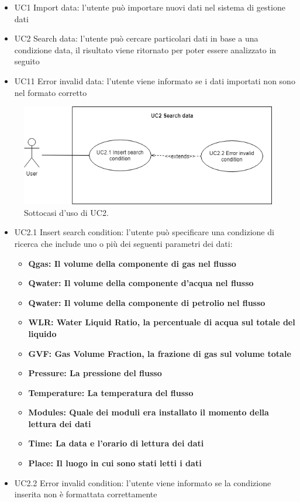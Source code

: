 \begin{itemize}
	\item UC1 Import data: l'utente può importare nuovi dati nel sistema di gestione dati
	\item UC2 Search data: l'utente può cercare particolari dati in base a una condizione data, il risultato viene ritornato per poter essere analizzato in seguito
	\item UC11 Error invalid data: l'utente viene informato se i dati importati non sono nel formato corretto
\end{itemize}


\begin{figure} [H]
	\includegraphics[width=\textwidth]{figures/UC2}
	\caption[Caso d'uso UC2]{
		Sottocasi d'uso di UC2.
		\label{fig:UC2}}
\end{figure}

\begin{itemize}
	\item UC2.1 Insert search condition: l'utente può specificare una condizione di ricerca che include uno o più dei seguenti parametri dei dati:
	\begin{itemize}
		\item \bfseries{Qgas}: Il volume della componente di gas nel flusso
		\item \bfseries{Qwater}: Il volume della componente d'acqua nel flusso
		\item \bfseries{Qwater}: Il volume della componente di petrolio nel flusso
		\item \bfseries{WLR}: Water Liquid Ratio, la percentuale di acqua sul totale del liquido
		\item \bfseries{GVF}: Gas Volume Fraction, la frazione di gas sul volume totale
		\item \bfseries{Pressure}: La pressione del flusso
		\item \bfseries{Temperature}: La temperatura del flusso
		\item \bfseries{Modules}: Quale dei moduli era installato il momento della lettura dei dati
		\item \bfseries{Time}: La data e l'orario di lettura dei dati
		\item \bfseries{Place}: Il luogo in cui sono stati letti i dati
	\end{itemize}

	\item UC2.2 Error invalid condition: l'utente viene informato se la condizione inserita non è formattata correttamente
\end{itemize}

